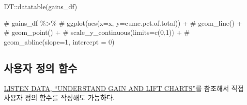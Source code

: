 \documentclass[
  letterpaper,
  chapter,a4paper,showtrims,openright,hidelinks]{oblivoir}
\newenvironment{Shaded}{\begin{snugshade}}{\end{snugshade}}
\newcommand{\CommentTok}[1]{\textcolor[rgb]{0.37,0.37,0.37}{#1}}
\newcommand{\FunctionTok}[1]{\textcolor[rgb]{0.28,0.35,0.67}{#1}}
\newcommand{\NormalTok}[1]{\textcolor[rgb]{0.00,0.23,0.31}{#1}}
\newcommand{\SpecialCharTok}[1]{\textcolor[rgb]{0.37,0.37,0.37}{#1}}
\begin{document}
\begin{Shaded}
\begin{Highlighting}[]
\NormalTok{DT}\SpecialCharTok{::}\FunctionTok{datatable}\NormalTok{(gains\_df)}

\CommentTok{\# gains\_df \%\textgreater{}\% }
\CommentTok{\#     ggplot(aes(x=x, y=cume.pct.of.total)) +}
\CommentTok{\#       geom\_line() +}
\CommentTok{\#       geom\_point() +}
\CommentTok{\#       scale\_y\_continuous(limits=c(0,1)) +}
\CommentTok{\#       geom\_abline(slope=1, intercept = 0)}
\end{Highlighting}
\end{Shaded}

\hypertarget{predictive-model-caret-business-dataset-compute-custom}{%
\subsection{사용자 정의
함수}\label{predictive-model-caret-business-dataset-compute-custom}}

\href{https://www.listendata.com/2014/08/excel-template-gain-and-lift-charts.html}{LISTEN
DATA, ``UNDERSTAND GAIN AND LIFT CHARTS''}를 참조해서 직접 사용자 정의
함수를 작성해도 가능하다.
\end{document}
